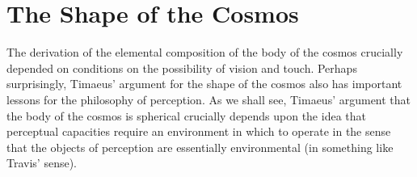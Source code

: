 
\section{The Shape of the Cosmos} %
\label{sec:the_shape_of_the_cosmos}

The derivation of the elemental composition of the body of the cosmos crucially depended on conditions on the possibility of vision and touch. Perhaps surprisingly, Timaeus' argument for the shape of the cosmos also has important lessons for the philosophy of perception. As we shall see, Timaeus' argument that the body of the cosmos is spherical crucially depends upon the idea that perceptual capacities require an environment in which to operate in the sense that the objects of perception are essentially environmental (in something like Travis' \citeyear{Travis:2005ys} sense). 




